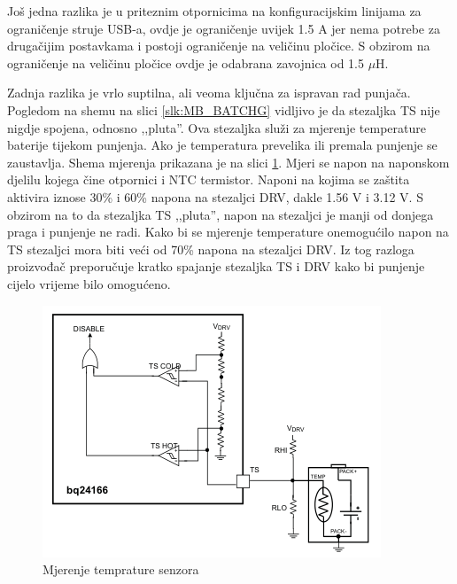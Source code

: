 Još jedna razlika je u priteznim otpornicima na konfiguracijskim linijama za ograničenje struje USB-a, ovdje je ograničenje uvijek 1.5 A jer nema potrebe za drugačijim postavkama i postoji ograničenje na veličinu pločice. S obzirom na ograničenje na veličinu pločice ovdje je odabrana zavojnica od 1.5 $\mu \textrm{H}$.

Zadnja razlika je vrlo suptilna, ali veoma ključna za ispravan rad punjača. Pogledom na shemu na slici \ref{slk:MB_BATCHG} vidljivo je da stezaljka TS nije nigdje spojena, odnosno ,,pluta''. Ova stezaljka služi za mjerenje temperature baterije tijekom punjenja. Ako je temperatura prevelika ili premala punjenje se zaustavlja. Shema mjerenja prikazana je na slici \ref{slk:BATCHG_TS}. Mjeri se napon na naponskom djelilu kojega čine otpornici i NTC termistor. Naponi na kojima se zaštita aktivira iznose 30\% i 60\% napona na stezaljci DRV, dakle 1.56 V i 3.12 V. S obzirom na to da stezaljka TS ,,pluta'', napon na stezaljci je manji od donjega praga i punjenje ne radi. Kako bi se mjerenje temperature onemogućilo napon na TS stezaljci mora biti veći od 70\% napona na stezaljci DRV. Iz tog razloga proizvođač preporučuje kratko spajanje stezaljka TS i DRV kako bi punjenje cijelo vrijeme bilo omogućeno.
\begin{figure}[htb]
    \centering
    \includegraphics[width=10 cm]{Figures/BATCHG_TS.png}
    \caption{Mjerenje temprature senzora}
    \label{slk:BATCHG_TS}
\end{figure}

